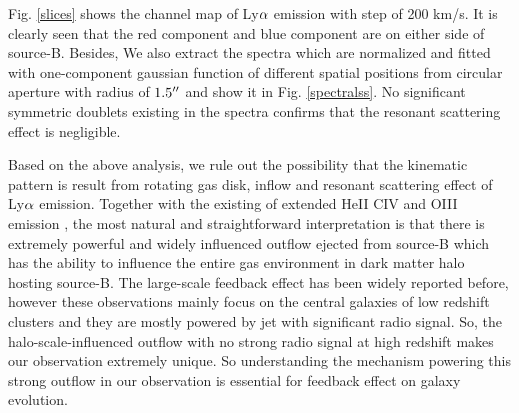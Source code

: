 \documentclass[../Results.tex]{subfiles}
\begin{document}
Fig. \ref{slices} shows the channel map of Ly$\rm \alpha$ emission with step of 200 km/s. It is clearly seen that the red component and blue component are on either side of source-B. Besides, We also extract the spectra which are normalized and fitted with one-component gaussian function of different spatial positions from circular aperture with radius of $\rm 1.5 \mbox{$^{\prime\prime}$}$ and show it in Fig. \ref{spectralss}. No significant symmetric doublets existing in the spectra confirms that the resonant scattering effect is negligible. 

Based on the above analysis, we rule out the possibility that the kinematic pattern is result from rotating gas disk, inflow and resonant scattering effect of Ly$\rm \alpha$ emission. Together with the existing of extended HeII CIV and OIII emission \citep{cai2017discovery}, the most natural and straightforward interpretation is that there is extremely powerful and widely influenced outflow ejected from source-B which has the ability to influence the entire gas environment in dark matter halo hosting source-B. The large-scale feedback effect has been widely reported before, however these observations mainly focus on the central galaxies of low redshift clusters and they are mostly powered by jet with significant radio signal. So, the halo-scale-influenced outflow with no strong radio signal at high redshift makes our observation extremely unique. So understanding the mechanism powering this strong outflow in our observation is essential for feedback effect on galaxy evolution.  
\end{document}
